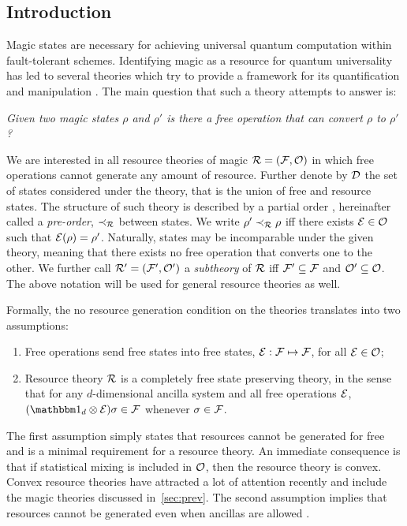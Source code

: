 \documentclass[pra,
aps,
twocolumn,
superscriptaddress,
groupedaddress,
nofootinbib,
reprint
]{revtex4-1}
\begin{document}
\subsection{Introduction}
\label{sec:intro}

Magic states are necessary for achieving universal quantum computation within fault-tolerant schemes.
Identifying magic as a resource for quantum universality has led to several theories which try to provide a framework for its quantification and manipulation .
The main question that such a theory attempts to answer is:
\begin{center}
    \emph{Given two magic states $\rho$ and $\rho'$ is there a free operation that can convert $\rho$ to $\rho'$?}
\end{center}

We are interested in all resource theories of magic $\mathcal{R} = (\mathcal{F}, \mathcal{O})$ in which free operations cannot generate any amount of resource. 
Further denote by $\mathcal{D}$ the set of states considered under the theory, that is the union of free and resource states.
The structure of such theory is described by a partial order , hereinafter called a \emph{pre-order}, $\prec_{\mathcal{R}}$ between states.
We write $\rho' \prec_{\mathcal{R}} \rho$ iff there exists $\mathcal{E} \in \mathcal{O}$ such that $\mathcal{E}(\rho) = \rho'$.
Naturally, states may be incomparable under the given theory, meaning that there exists no free operation that converts one to the other.
We further call $\mathcal{R}' = (\mathcal{F}', \mathcal{O}')$ a \emph{subtheory} of $\mathcal{R}$ iff $\mathcal{F}' \subseteq \mathcal{F}$ and $\mathcal{O}' \subseteq \mathcal{O}$. 
The above notation will be used for general resource theories as well.

Formally, the no resource generation condition on the theories translates into two assumptions:
\begin{enumerate}[I]
    \item Free operations send free states into free states, $\mathcal{E}: \mathcal{F} \mapsto \mathcal{F}$, for all $\mathcal{E} \in \mathcal{O}$;
    \item Resource theory $\mathcal{R}$ is a completely free state preserving theory, in the sense that for any $d$-dimensional ancilla system and all free operations $\mathcal{E}$, $(\id_d \otimes \E ) \sigma \in \F$ whenever $\sigma \in \mathcal{F}$.
\end{enumerate}
The first assumption simply states that resources cannot be generated for free and is a minimal requirement for a resource theory. 
An immediate consequence is that if statistical mixing is included in $\mathcal{O}$, then the resource theory is convex.
Convex resource theories have attracted a lot of attention recently  and include the magic theories discussed in~\cref{sec:prev}.
The second assumption implies that resources cannot be generated even when ancillas are allowed .
\end{document}
